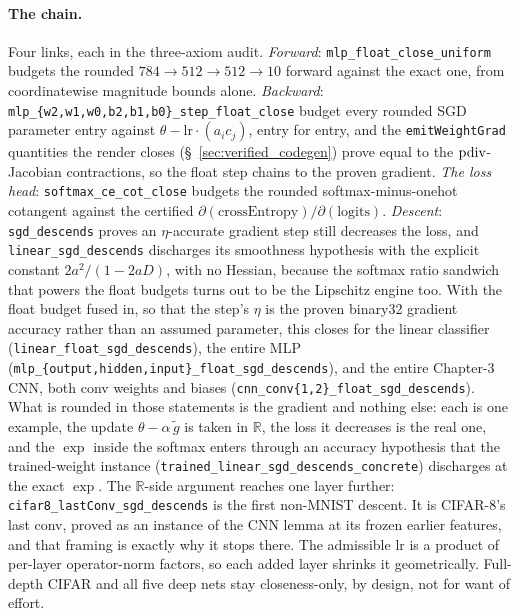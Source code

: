 \paragraph{The chain.} Four links, each in the three-axiom audit.
\emph{Forward}: \texttt{mlp\_float\_close\_uniform} budgets the
rounded \(784{\to}512{\to}512{\to}10\) forward against the exact
one, from coordinatewise magnitude bounds alone. \emph{Backward}:
\texttt{mlp\_\{w2,w1,w0,b2,b1,b0\}\_step\_float\_close} budget
every rounded SGD parameter entry against \(\theta -
\mathrm{lr}\cdot(a_i c_j)\), entry for entry, and the
\texttt{emitWeightGrad} quantities the render closes
(\S~\ref{sec:verified_codegen}) prove equal to the
\(\operatorname{pdiv}\)-Jacobian contractions, so the float step chains to the
proven gradient. \emph{The loss head}:
\texttt{softmax\_ce\_cot\_close} budgets the rounded
softmax-minus-onehot cotangent against the certified
\(\partial(\mathrm{crossEntropy})/\partial(\mathrm{logits})\).
\emph{Descent}: \texttt{sgd\_descends} proves an \(\eta\)-accurate
gradient step still decreases the loss, and
\texttt{linear\_sgd\_descends} discharges its smoothness hypothesis with
the explicit constant \(2a^2/(1-2aD)\), with no Hessian, because the softmax
ratio sandwich that powers the float budgets turns out to be the Lipschitz
engine too. With the float budget fused in, so that the step's
\(\eta\) is the proven binary32 gradient accuracy rather than an
assumed parameter, this closes for the linear classifier
(\texttt{linear\_float\_sgd\_descends}), the entire MLP
(\texttt{mlp\_\{output,hidden,input\}\_float\_sgd\_descends}), and the
entire Chapter-3 CNN, both conv weights and biases
(\texttt{cnn\_conv\{1,2\}\_float\_sgd\_descends}). What is rounded in
those statements is the gradient and nothing else: each is one example,
the update \(\theta - \alpha\,\tilde g\) is taken in \(\mathbb{R}\), the
loss it decreases is the real one, and the \(\exp\) inside the softmax
enters through an accuracy hypothesis that the trained-weight instance
(\texttt{trained\_linear\_sgd\_descends\_concrete}) discharges at the
exact \(\exp\). The \(\mathbb{R}\)-side
argument reaches one layer further:
\texttt{cifar8\_lastConv\_sgd\_descends} is the first non-MNIST descent. It is
CIFAR-8's last conv, proved as an instance of the CNN lemma at its
frozen earlier features, and that framing is exactly why it stops there.
The admissible \(\mathrm{lr}\) is a product of per-layer operator-norm
factors, so each added layer shrinks it geometrically. Full-depth CIFAR and
all five deep nets stay closeness-only, by design, not for want of effort.

